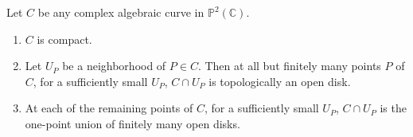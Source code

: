 Let $C$ be any complex algebraic curve in $\mathbb{P}^2(\mathbb{C})$.

\begin{enumerate}
\item[(4.1.1)] $C$ is compact.
\item[(4.1.2)] Let $U_P$ be a neighborhood of $P \in C$. Then at all but finitely many points $P$ of $C$, for a sufficiently small $U_P$, $C \cap U_P$ is topologically an open disk.
\item[(4.1.3)] At each of the remaining points of $C$, for a sufficiently small $U_P$, $C \cap U_P$ is the one-point union of finitely many open disks.
\end{enumerate}
